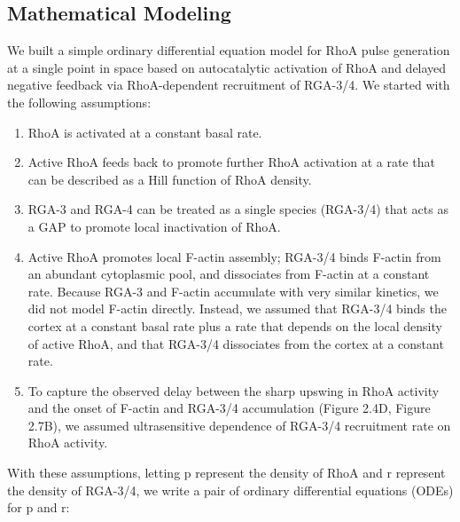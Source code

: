 \documentclass{ucetd}
\begin{document}
{{{{\subsection{Mathematical Modeling}
We built a simple ordinary differential equation model for RhoA pulse generation at a single point in space based on autocatalytic activation of RhoA and delayed negative feedback via RhoA-dependent recruitment of RGA-3/4.  We started with the following assumptions:


\begin{enumerate}  
\item RhoA is activated at a constant basal rate.
\item Active RhoA feeds back to promote further RhoA activation at a rate that can be described as a Hill function of RhoA density. 
\item RGA-3 and RGA-4 can be treated as a single species (RGA-3/4) that acts as a GAP to promote local inactivation of RhoA. 
\item Active RhoA promotes local F-actin assembly; RGA-3/4 binds F-actin from an abundant cytoplasmic pool, and dissociates from F-actin at a constant rate. Because RGA-3 and F-actin accumulate with very similar kinetics,  we did not model F-actin directly.  Instead, we assumed that RGA-3/4 binds the cortex at a constant basal rate plus a rate that depends on the local density of active RhoA, and that RGA-3/4 dissociates from the cortex at a constant rate. 
\item To capture the observed delay between the sharp upswing in RhoA activity and the onset of F-actin and RGA-3/4 accumulation (Figure 2.4D, Figure 2.7B), we assumed ultrasensitive dependence of RGA-3/4 recruitment rate on RhoA activity.
\end{enumerate}


With these assumptions, letting p represent the density of RhoA and r represent the density of RGA-3/4,  we write a pair of ordinary differential equations (ODEs) for p and r:

}}}}
\end{document}
